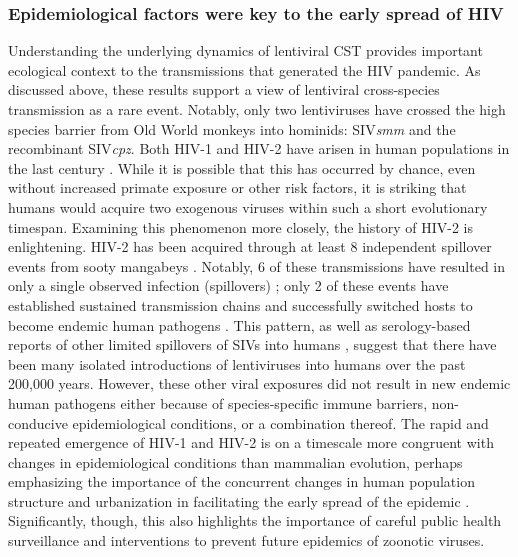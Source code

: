 \subsubsection*{Epidemiological factors were key to the early spread of HIV}
Understanding the underlying dynamics of lentiviral CST provides important ecological context to the transmissions that generated the HIV pandemic.
As discussed above, these results support a view of lentiviral cross-species transmission as a rare event.
Notably, only two lentiviruses have crossed the high species barrier from Old World monkeys into hominids: SIV\textit{smm} and the recombinant SIV\textit{cpz}.
Both HIV-1 and HIV-2 have arisen in human populations in the last century \citep{faria2014early,sharp2011origins}.
While it is possible that this has occurred by chance, even without increased primate exposure or other risk factors, it is striking that humans would acquire two exogenous viruses within such a short evolutionary timespan.
Examining this phenomenon more closely, the history of HIV-2 is enlightening.
HIV-2 has been acquired through at least 8 independent spillover events from sooty mangabeys \citep{sharp2011origins}.
Notably, 6 of these transmissions have resulted in only a single observed infection (spillovers) \citep{chen1996genetic,chen1997human,gao1992human}; only 2 of these events have established sustained transmission chains and successfully switched hosts to become endemic human pathogens \citep{damond2001quantification,ishikawa2001genetic,pieniazek1999predominance}.
This pattern, as well as serology-based reports of other limited spillovers of SIVs into humans \citep{kalish2005central,souquiere2001wild}, suggest that there have been many isolated introductions of lentiviruses into humans over the past 200,000 years.
However, these other viral exposures did not result in new endemic human pathogens either because of species-specific immune barriers, non-conducive epidemiological conditions, or a combination thereof.
The rapid and repeated emergence of HIV-1 and HIV-2 is on a timescale more congruent with changes in epidemiological conditions than mammalian evolution, perhaps emphasizing the importance of the concurrent changes in human population structure and urbanization in facilitating the early spread of the epidemic \citep{faria2014early}.
Significantly, though, this also highlights the importance of careful public health surveillance and interventions to prevent future epidemics of zoonotic viruses.

